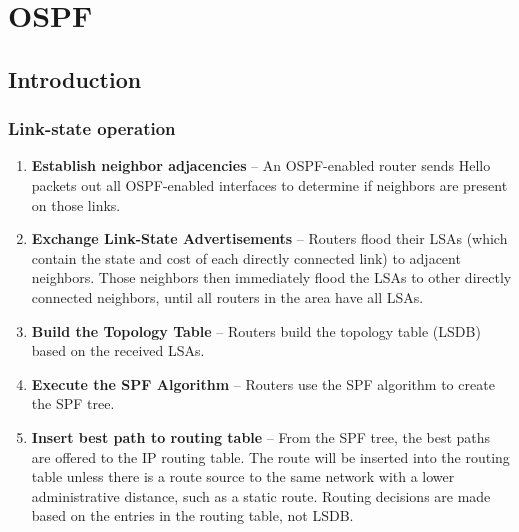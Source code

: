 \chapter{OSPF}
\section{Introduction}
\subsection{Link-state operation}
\begin{enumerate}
	\item \textbf{Establish neighbor adjacencies} -- An OSPF-enabled router sends Hello packets out all OSPF-enabled interfaces to determine if neighbors are present on those links. %
	\item \textbf{Exchange Link-State Advertisements} -- Routers flood their LSAs (which contain the state and cost of each directly connected link) to adjacent neighbors. Those neighbors then immediately flood the LSAs to other directly connected neighbors, until all routers in the area have all LSAs.
	\item \textbf{Build the Topology Table} -- Routers build the topology table (LSDB) based on the received LSAs.
	\item \textbf{Execute the SPF Algorithm} -- Routers use the SPF algorithm to create the SPF tree.
	\item \textbf{Insert best path to routing table} -- From the SPF tree, the best paths are offered to the IP routing table. The route will be inserted into the routing table unless there is a route source to the same network with a lower administrative distance, such as a static route. Routing decisions are made based on the entries in the routing table, not LSDB.
	\end{enumerate}

